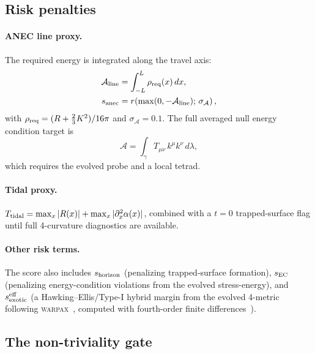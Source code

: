 \documentclass[twocolumn,floatfix,aps,prd,nofootinbib]{revtex4-2}
\begin{document}
\subsection{Risk penalties}

\paragraph{ANEC line proxy.}
The required energy is integrated along the travel axis:
\begin{equation}
    \begin{aligned}
    \mathcal{A}_{\rm line}
    &= \int_{-L}^{L}\rho_{\rm req}(x)\,dx,\\
    s_{\rm anec}
    &= r\!\left(\max(0,-\mathcal{A}_{\rm line});\,\sigma_{\mathcal A}\right),
    \end{aligned}
    \label{eq:anec_line}
\end{equation}
with $\rho_{\rm req}=(R+\tfrac{2}{3}K^2)/16\pi$ and $\sigma_{\mathcal A}=0.1$.  The full averaged null energy condition target is
\begin{equation}
    \mathcal{A} = \int_\gamma T_{\mu\nu}\,k^\mu k^\nu\,d\lambda,
    \label{eq:anec}
\end{equation}
which requires the evolved probe and a local tetrad.

\paragraph{Tidal proxy.}
$T_{\rm tidal}=\max_x|R(x)|+\max_x|\partial_x^2\alpha(x)|$, combined with a $t=0$ trapped-surface flag until full 4-curvature diagnostics are available.

\paragraph{Other risk terms.}
The score also includes $s_{\rm horizon}$ (penalizing trapped-surface formation), $s_{\rm EC}$ (penalizing energy-condition violations from the evolved stress-energy), and $s_{\rm exotic}^{\rm eff}$ (a Hawking--Ellis/Type-I hybrid margin from the evolved 4-metric following \textsc{warpax}~\cite{le2026warpax}, computed with fourth-order finite differences~\cite{lousto2006fourth}).

\subsection{The non-triviality gate}
\end{document}
